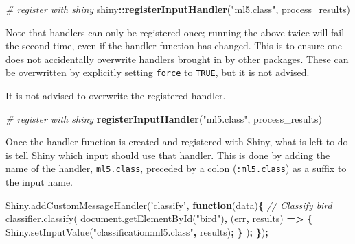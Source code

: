 \documentclass[10pt,]{krantz}
\makeatletter
\newenvironment{Shaded}{\begin{snugshade}}{\end{snugshade}}
\newcommand{\AttributeTok}[1]{\textcolor[rgb]{0.61,0.61,0.61}{#1}}
\newcommand{\CommentTok}[1]{\textcolor[rgb]{0.37,0.37,0.37}{\textit{#1}}}
\newcommand{\KeywordTok}[1]{\textcolor[rgb]{0.27,0.27,0.27}{\textbf{#1}}}
\newcommand{\NormalTok}[1]{#1}
\newcommand{\OperatorTok}[1]{\textcolor[rgb]{0.43,0.43,0.43}{\textbf{#1}}}
\newcommand{\StringTok}[1]{\textcolor[rgb]{0.5,0.5,0.5}{#1}}
\newcommand{\VariableTok}[1]{\textcolor[rgb]{0,0,0}{#1}}
\newenvironment{kframe}{%
\medskip{}
\setlength{\fboxsep}{.8em}
 \def\at@end@of@kframe{}%
 \ifinner\ifhmode%
  \def\at@end@of@kframe{\end{minipage}}%
  \begin{minipage}{\columnwidth}%
 \fi\fi%
 \def\FrameCommand##1{\hskip\@totalleftmargin \hskip-\fboxsep
 \colorbox{shadecolor}{##1}\hskip-\fboxsep
     \hskip-\linewidth \hskip-\@totalleftmargin \hskip\columnwidth}%
 \MakeFramed {\advance\hsize-\width
   \@totalleftmargin\z@ \linewidth\hsize
   \@setminipage}}%
 {\par\unskip\endMakeFramed%
 \at@end@of@kframe}
\renewenvironment{Shaded}{\begin{kframe}}{\end{kframe}}
\newenvironment{rmdblock}[1]
  {
  \begin{itemize}
  \renewcommand{\labelitemi}{
    \raisebox{-.7\height}[0pt][0pt]{
      {\setkeys{Gin}{width=3em,keepaspectratio}\texttt{[image: images/\#1]}}
    }
  }
  \setlength{\fboxsep}{1em}
  \begin{kframe}
  \item
  }
  {
  \end{kframe}
  \end{itemize}
  }
\newenvironment{rmdnote}
  {\begin{rmdblock}{note}}
  {\end{rmdblock}}
\makeatother
\begin{document}
\begin{Shaded}
\begin{Highlighting}[]
\CommentTok{# register with shiny}
\NormalTok{shiny}\OperatorTok{::}\KeywordTok{registerInputHandler}\NormalTok{(}\StringTok{"ml5.class"}\NormalTok{, process_results)}
\end{Highlighting}
\end{Shaded}

Note that handlers can only be registered once; running the above twice will fail the second time, even if the handler function has changed. This is to ensure one does not accidentally overwrite handlers brought in by other packages. These can be overwritten by explicitly setting \texttt{force} to \texttt{TRUE}, but it is not advised.

\begin{rmdnote}
It is not advised to overwrite the registered handler.
\end{rmdnote}

\begin{Shaded}
\begin{Highlighting}[]
\CommentTok{# register with shiny}
\KeywordTok{registerInputHandler}\NormalTok{(}\StringTok{"ml5.class"}\NormalTok{, process_results)}
\end{Highlighting}
\end{Shaded}

Once the handler function is created and registered with Shiny, what is left to do is tell Shiny which input should use that handler. This is done by adding the name of the handler, \texttt{ml5.class}, preceded by a colon (\texttt{:ml5.class}) as a suffix to the input name.

\begin{Shaded}
\begin{Highlighting}[]
\VariableTok{Shiny}\NormalTok{.}\AttributeTok{addCustomMessageHandler}\NormalTok{(}\StringTok{'classify'}\OperatorTok{,} \KeywordTok{function}\NormalTok{(data)}\OperatorTok{\{}
  \CommentTok{// Classify bird}
  \VariableTok{classifier}\NormalTok{.}\AttributeTok{classify}\NormalTok{(}
    \VariableTok{document}\NormalTok{.}\AttributeTok{getElementById}\NormalTok{(}\StringTok{"bird"}\NormalTok{)}\OperatorTok{,}\NormalTok{ (err}\OperatorTok{,}\NormalTok{ results) }\KeywordTok{=>} \OperatorTok{\{}
      \VariableTok{Shiny}\NormalTok{.}\AttributeTok{setInputValue}\NormalTok{(}\StringTok{"classification:ml5.class"}\OperatorTok{,}\NormalTok{ results)}\OperatorTok{;}
    \OperatorTok{\}}
\NormalTok{  )}\OperatorTok{;}
\OperatorTok{\}}\NormalTok{)}\OperatorTok{;}
\end{Highlighting}
\end{Shaded}
\end{document}
